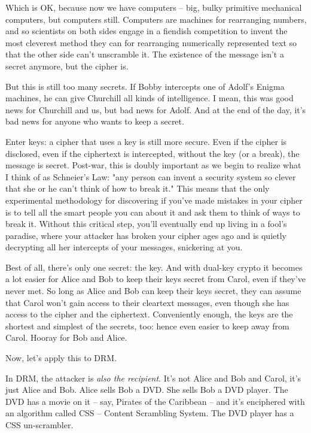 Which is OK, because now we have computers -- big, bulky primitive
mechanical computers, but computers still. Computers are machines
for rearranging numbers, and so scientists on both sides engage in
a fiendish competition to invent the most cleverest method they can
for rearranging numerically represented text so that the other side
can't unscramble it. The existence of the message isn't a secret
anymore, but the cipher is.

But this is still too many secrets. If Bobby intercepts one of
Adolf's Enigma machines, he can give Churchill all kinds of
intelligence. I mean, this was good news for Churchill and us, but
bad news for Adolf. And at the end of the day, it's bad news for
anyone who wants to keep a secret.

Enter keys: a cipher that uses a key is still more secure. Even if
the cipher is disclosed, even if the ciphertext is intercepted,
without the key (or a break), the message is secret. Post-war, this
is doubly important as we begin to realize what I think of as
Schneier's Law: "any person can invent a security system so clever
that she or he can't think of how to break it." This means that the
only experimental methodology for discovering if you've made
mistakes in your cipher is to tell all the smart people you can
about it and ask them to think of ways to break it. Without this
critical step, you'll eventually end up living in a fool's
paradise, where your attacker has broken your cipher ages ago and
is quietly decrypting all her intercepts of your messages,
snickering at you.

Best of all, there's only one secret: the key. And with dual-key
crypto it becomes a lot easier for Alice and Bob to keep their keys
secret from Carol, even if they've never met. So long as Alice and
Bob can keep their keys secret, they can assume that Carol won't
gain access to their cleartext messages, even though she has access
to the cipher and the ciphertext. Conveniently enough, the keys are
the shortest and simplest of the secrets, too: hence even easier to
keep away from Carol. Hooray for Bob and Alice.

Now, let's apply this to DRM.

In DRM, the attacker is \emph{also the recipient}. It's not Alice
and Bob and Carol, it's just Alice and Bob. Alice sells Bob a DVD.
She sells Bob a DVD player. The DVD has a movie on it -- say,
Pirates of the Caribbean -- and it's enciphered with an algorithm
called CSS -- Content Scrambling System. The DVD player has a CSS
un-scrambler.

